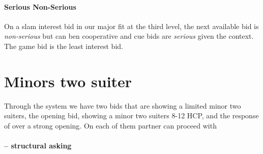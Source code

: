 \paragraph{Serious Non-Serious} On a slam interest bid in our major fit at the third level, the next available bid is \emph{non-serious} but can ben cooperative and cue bids are \emph{serious} given the context. The game bid is the least interest bid.
\section{Minors two suiter}
Through the system we have two bids that are showing a limited minor two suiters, the \bid{2\NT} opening bid, showing a minor two suiters 8-12 HCP, and the response of \bid{2\SpS} over a strong \bid{1\CS} opening. On each of them partner can proceed with
\paragraph{\bid{3\HS} – structural asking}

